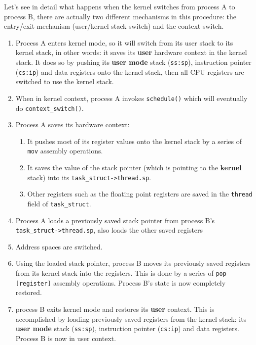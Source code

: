 \documentclass[10pt]{book}
\begin{document}
Let's see in detail what happens when the kernel switches from process A to process B, there are actually two different mechanisms in this procedure: the entry/exit mechanism (user/kernel stack switch) and the context switch.
\begin{enumerate}
    \item Process A enters kernel mode, so it will switch from its user stack to its kernel stack, in other words: it saves its \textbf{user} hardware context in the kernel stack. It does so by pushing its \textbf{user mode} stack (\verb|ss:sp|), instruction pointer (\verb|cs:ip|) and data registers onto the kernel stack, then all CPU registers are switched to use the kernel stack.
    \item When in kernel context, process A invokes \verb|schedule()| which will eventually do \verb|context_switch()|.
    \item Process A saves its hardware context: 
    \begin{enumerate}
        \item It pushes most of its register values onto the kernel stack by a series of \verb|mov| assembly operations.
        \item It saves the value of the stack pointer (which is pointing to the \textbf{kernel} stack) into its \verb|task_struct->thread.sp|.
        \item Other registers such as the floating point registers are saved in the \verb|thread| field of \verb|task_struct|.
    \end{enumerate}
    \item Process A loads a previously saved stack pointer from process B's\\ \verb|task_struct->thread.sp|, also loads the other saved registers
    \item Address spaces are switched.
    \item Using the loaded stack pointer, process B moves its previously saved registers from its kernel stack into the registers. This is done by a series of \verb|pop [register]| assembly operations. Process B's state is now completely restored.
    \item process B exits kernel mode and restores its \textbf{user} context. This is accomplished by loading previously saved registers from the kernel stack: its \textbf{user mode} stack (\verb|ss:sp|), instruction pointer (\verb|cs:ip|) and data registers. Process B is now in user context.
\end{enumerate} %
\end{document}
